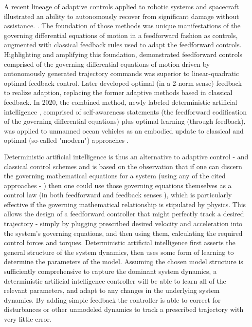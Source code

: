 \documentclass[applsci,article,submit,pdftex,moreauthors]{Definitions/mdpi}
\begin{document}
A recent lineage of adaptive controls applied to robotic systems \cite{Slotine90, Slotine91} and spacecraft \cite{Fossen93, Sands09} illustrated an ability to autonomously recover from significant damage without assistance. \cite{Nakatani14}. The foundation of those methods was unique manifestations of the governing differential equations of motion in a feedforward fashion as controls, augmented with classical feedback rules used to adapt the feedforward controls. Highlighting and amplifying this foundation, \cite{Cooper17} demonstrated feedforward controls comprised of the governing differential equations of motion driven by autonomously generated trajectory commands was superior to linear-quadratic optimal feedback control. Later \cite{Smeresky20} developed optimal (in a 2-norm sense) feedback to realize adaption, replacing the former adaptive methods based in classical feedback. In 2020, the combined method, newly labeled deterministic artificial intelligence \cite{Sands20}, comprised of self-awareness statements (the feedforward codification of the governing differential equations) plus optimal learning (through feedback), was applied to unmanned ocean vehicles \cite{Sands20} as an embodied update to classical \cite{Sands18} and optimal (so-called "modern") approaches \cite{Fossen94}. 

Deterministic artificial intelligence \cite{Sands20} is thus an alternative to adaptive control \cite{Slotine90} - \cite{Nakatani14} and classical control schemes \cite{Sands18} and is based on the observation that if one can discern the governing mathematical equations for a system (using any of the cited approaches \cite{Newton87} - \cite{Pontryagin62}) then one could use those governing equations themselves as a control law (in both feedforward \cite{Cooper17} and feedback senses \cite{Smeresky20}), which is particularly effective if the governing mathematical relationship is stipulated by physics. This allows the design of a feedforward controller that might perfectly track a desired trajectory \cite{Sands21}-\cite{Shah21} simply by plugging prescribed desired velocity and acceleration into the system’s governing equations, and then using them, calculating the required control forces and torques. Deterministic artificial intelligence first asserts the general structure of the system dynamics, then uses some form of learning to determine the parameters of the model. \cite{Smeresky20} Assuming the chosen model structure is sufficiently comprehensive to capture the dominant system dynamics, a deterministic artificial intelligence controller will be able to learn all of the relevant parameters, \cite{Sands20} and adapt to any changes in the underlying system dynamics. By adding simple feedback the controller is able to correct for disturbances or other unmodeled dynamics to track a prescribed trajectory with very little error.
\end{document}
